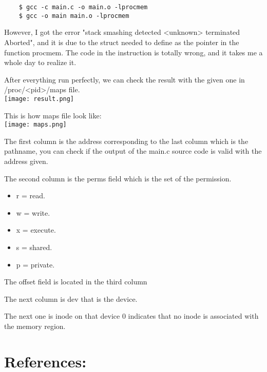 \documentclass[a4paper, 11pt]{article}
\begin{document}
\begin{verbatim}
    $ gcc -c main.c -o main.o -lprocmem
    $ gcc -o main main.o -lprocmem
\end{verbatim}

\par{However, I got the error "stack smashing detected <unknown> terminated Aborted", and it is due to the struct needed to define as the pointer in the function procmem. The code in the instruction is totally wrong, and it takes me a whole day to realize it.}

\par{After everything run perfectly, we can check the result with the given one in /proc/<pid>/maps file.} \\

\texttt{[image: result.png]}
\bigbreak

\par{This is how maps file look like:}
\\
\texttt{[image: maps.png]}
\bigbreak

\par{The first column is the address corresponding to the last column which is the pathname, you can check if the output of the main.c source code is valid with the address given.}
\par{The second column is the perms field which is the set of the permission.}
\begin{itemize}
    \item r = read.
    \item w = write.
    \item x = execute.
    \item s = shared.
    \item p = private.
\end{itemize}

\par{The offset field is located in the third column}
\par{The next column is dev that is the device.}
\par{The next one is inode on that device 0 indicates that no inode is associated with the memory region.}

\section{References:}

\nocite{FAQ,gjaingjain,kerrisk_2012,pomerantz_2000,shared,tajiryan}


\end{document}
